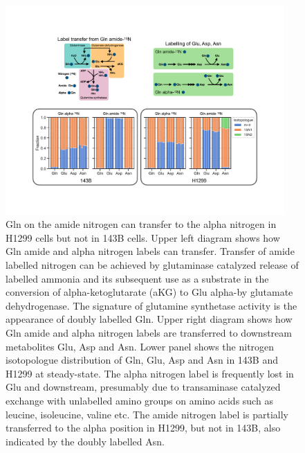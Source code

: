 \begin{figure}
    \centering
    \includegraphics[width=0.95\textwidth]{figures/chap2/gln_lab_tranfr.pdf}
    \caption[Gln amide to alpha \hNi{} transfer]{
    Gln \hNi{} on the amide nitrogen can transfer to the alpha nitrogen in H1299 cells but not in 143B cells.
    Upper left diagram shows how Gln amide and alpha nitrogen labels can transfer.
    Transfer of amide labelled nitrogen can be achieved by glutaminase catalyzed release of labelled ammonia and its subsequent use as a substrate in the conversion of alpha-ketoglutarate (aKG) to Glu alpha-\hNi by glutamate dehydrogenase.
    The signature of glutamine synthetase activity is the appearance of doubly labelled Gln.
    Upper right diagram shows how Gln amide and alpha nitrogen labels are transferred to downstream metabolites Glu, Asp and Asn.
    Lower panel shows the nitrogen isotopologue distribution of Gln, Glu, Asp and Asn in 143B and H1299 at steady-state.
    The alpha nitrogen label is frequently lost in Glu and downstream, presumably due to transaminase catalyzed exchange with unlabelled amino groups on amino acids such as leucine, isoleucine, valine etc.
    The amide nitrogen label is partially transferred to the alpha position in H1299, but not in 143B, also indicated by the doubly labelled Asn.
    }
    \label{fig:ch2:gln_lab_tranfr}
\end{figure}


